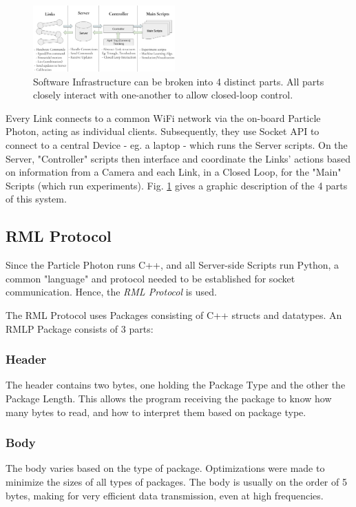 \documentclass[letterpaper, 10 pt, conference]{ieeeconf}  %
\begin{document}
\begin{figure}[H]
\centering
\includegraphics[width=0.485\textwidth]{media/SoftwareInfrastructure.png}
   \caption{\label{fig_softwareInfrastructure} Software Infrastructure can be broken into 4 distinct parts. All parts closely interact with one-another to allow closed-loop control.}
\end{figure}

Every Link connects to a common WiFi network via the on-board Particle Photon, acting as individual clients. Subsequently, they use Socket API to connect to a central Device - eg. a laptop - which runs the Server scripts. On the Server, "Controller" scripts then interface and coordinate the Links' actions based on information from a Camera and each Link, in a Closed Loop, for the "Main" Scripts (which run experiments). Fig. \ref{fig_softwareInfrastructure} gives a graphic description of the 4 parts of this system.

\subsection{RML Protocol}

Since the Particle Photon runs C++, and all Server-side Scripts run Python, a common "language" and protocol needed to be established for socket communication. Hence, the \textit{RML Protocol} is used.

The RML Protocol uses Packages consisting of C++ structs and datatypes. An RMLP Package consists of 3 parts:

\subsubsection{Header} The header contains two bytes, one holding the Package Type and the other the Package Length. This allows the program receiving the package to know how many bytes to read, and how to interpret them based on package type.
\subsubsection{Body} The body varies based on the type of package. Optimizations were made to minimize the sizes of all types of packages. The body is usually on the order of 5 bytes, making for very efficient data transmission, even at high frequencies.
\end{document}
